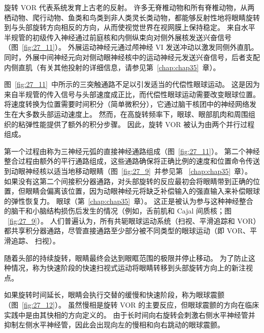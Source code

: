 旋转 VOR 代表系统发育上古老的反射。
许多无脊椎动物和所有脊椎动物，从两栖动物、爬行动物、鱼类和鸟类到非人类灵长类动物，都能够反射性地将眼睛旋转到与头部旋转方向相反的方向，从而使视觉世界在视网膜上保持稳定。
来自水平半规管的初级传入神经通过前庭核和内侧纵束向对侧外展核发送兴奋信号（图~\ref{fig:27_11}）。 外展运动神经元通过颅神经 VI 发送冲动以激发同侧外直肌。
同时，外展中间神经元向对侧动眼神经核中的运动神经元发送兴奋信号，后者支配内侧直肌（有关其他投射的详细信息，请参见第~\ref{chap:chap35}~章）。


图~\ref{fig:27_11}~中所示的三突触通路不足以引发适当的代偿性眼球运动。
这是因为来自半规管的传入信号与头部速度成正比，而代偿性眼球运动需要改变眼球位置。
将速度转换为位置需要时间积分（简单微积分），它通过脑干核团中的神经网络发生在大多数头部运动速度上。
然而，在高旋转频率下，眼球、眼部肌肉和周围组织的粘弹性能提供了额外的积分步骤。
因此，旋转 VOR 被认为由两个并行过程组成。


第一个过程由称为三神经元弧的直接神经通路组成（图~\ref{fig:27_11}）。
第二个神经整合过程由额外的平行通路组成，这些通路确保将正确比例的速度和位置命令传送到动眼神经核以适当地移动眼睛（图~\ref{fig:27_9}~并参见第 ~\ref{chap:chap35}~章）。
如果没有这第二个间接积分器通路，对头部旋转的反应最初会将眼睛带到正确的位置，但眼睛会偏离该位置，因为动眼神经元将缺乏补偿输入的强直输入来补偿眼球的弹性恢复力。
眼球（第~\ref{chap:chap35}~章）。
这正是被认为参与这种神经整合的脑干和小脑结构损伤后发生的情况（例如，舌前肌和 Cajal 间质核；图 ~\ref{fig:27_9}）。
人们普遍认为，所有共轭眼球运动系统（扫视、平滑追踪和 VOR）都共享积分器通路，尽管直接通路至少部分被不同类型的眼球运动（即 VOR、平滑追踪、 扫视）。


随着头部的持续旋转，眼睛最终会达到眼眶范围的极限并停止移动。
为了防止这种情况，称为快速阶段的快速扫视式运动将眼睛转移到头部旋转方向上的新注视点。


如果旋转时间延长，眼睛会执行交替的缓慢和快速阶段，称为眼球震颤（图~\ref{fig:27_12}）。
虽然慢相是旋转 VOR 的主要反应，但眼球震颤的方向在临床实践中是由其快相的方向定义的。
由于长时间向右旋转会刺激右侧水平神经管并抑制左侧水平神经管，因此会出现向左的慢相和向右跳动的眼球震颤。


